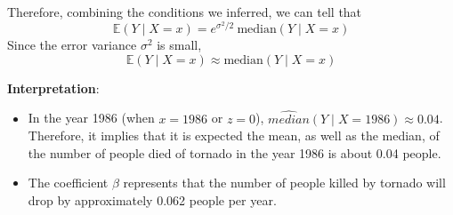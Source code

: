 \documentclass[
]{book}
\providecommand{\tightlist}{%
  \setlength{\itemsep}{0pt}\setlength{\parskip}{0pt}}
\begin{document}
Therefore, combining the conditions we inferred, we can tell that
\[\mathbb{E}(Y \mid X = x) = e^{\sigma^2 / 2} \ \text{median}(Y \mid X = x)\]
Since the error variance \(\sigma^2\) is small,
\[\mathbb{E}(Y \mid X = x) \approx \text{median}(Y \mid X = x)\]

\textbf{Interpretation}:

\begin{itemize}
\tightlist
\item
  In the year 1986 (when \(x = 1986\) or \(z = 0\)), \(\hat{median}(Y \mid X = 1986) \approx 0.04\). Therefore, it implies that it is expected the mean, as well as the median, of the number of people died of tornado in the year 1986 is about 0.04 people.
\item
  The coefficient \(\beta\) represents that the number of people killed by tornado will drop by approximately 0.062 people per year.
\end{itemize}

  
\end{document}
